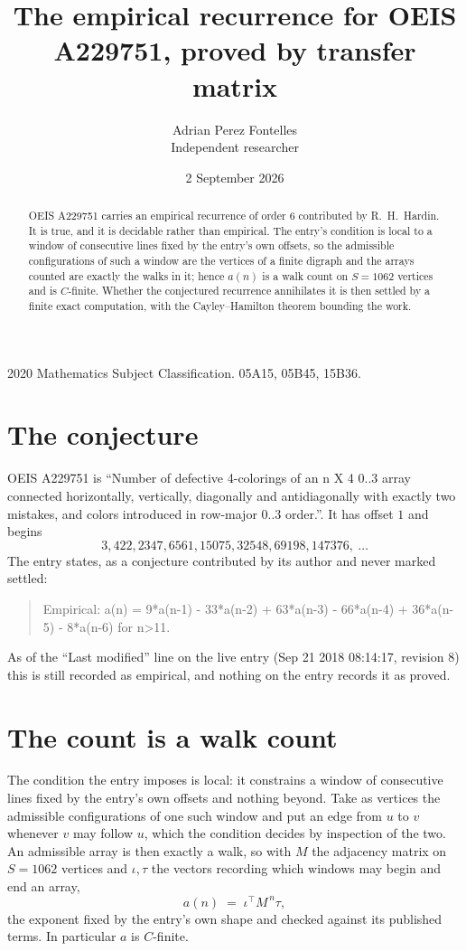 \documentclass[11pt,a4paper]{article}
\title{The empirical recurrence for OEIS A229751, proved by transfer matrix}
\author{Adrian Perez Fontelles\\ \small Independent researcher}
\date{2 September 2026}
\theoremstyle{plain}
\theoremstyle{definition}
\begin{document}
\maketitle

\begin{abstract}
OEIS A229751 carries an empirical recurrence of order $6$ contributed by R.~H.~Hardin. It is
true, and it is decidable rather than empirical. The entry's condition is local to a window of consecutive lines fixed by the entry's own offsets, so
the admissible configurations of such a window are the vertices of a finite digraph and the
arrays counted are exactly the walks in it; hence $a(n)$ is a walk count on $S=1062$ vertices
and is $C$-finite. Whether the conjectured recurrence annihilates it is then settled by a
finite exact computation, with the Cayley--Hamilton theorem bounding the work.
\end{abstract}

\noindent\small 2020 Mathematics Subject Classification. 05A15, 05B45, 15B36.\normalsize

\section{The conjecture}

OEIS A229751 is ``Number of defective 4-colorings of an n X 4 0..3 array connected horizontally, vertically, diagonally and antidiagonally with exactly two mistakes, and colors introduced in row-major 0..3 order.''. It has offset $1$ and begins
\[
3, 422, 2347, 6561, 15075, 32548, 69198, 147376,\ \dots
\]
The entry states, as a conjecture contributed by its author and never marked settled:
\begin{quote}
Empirical: a(n) = 9*a(n-1) - 33*a(n-2) + 63*a(n-3) - 66*a(n-4) + 36*a(n-5) - 8*a(n-6) for n>11.
\end{quote}
As of the ``Last modified'' line on the live entry (Sep 21 2018 08:14:17, revision 8) this is still
recorded as empirical, and nothing on the entry records it as proved.

\section{The count is a walk count}

The condition the entry imposes is local: it constrains a window of consecutive lines fixed by the entry's own offsets and nothing beyond. Take as
vertices the admissible configurations of one such window and put an edge from $u$ to $v$
whenever $v$ may follow $u$, which the condition decides by inspection of the two. An
admissible array is then exactly a walk, so with $M$ the adjacency matrix on $S=1062$ vertices
and $\iota,\tau$ the vectors recording which windows may begin and end an array,
\[
a(n)\;=\;\iota^{\!\top}M^{\,n}\tau ,
\]
the exponent fixed by the entry's own shape and checked against its published terms. In
particular $a$ is $C$-finite.
\end{document}
